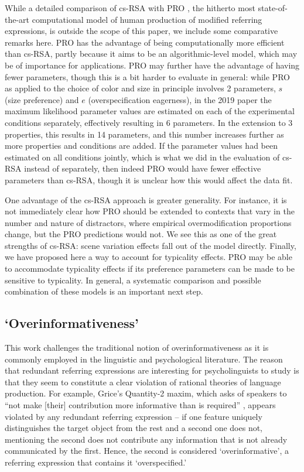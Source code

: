 \documentclass[11pt]{article}
\begin{document}
While a detailed comparison of cs-RSA with PRO \cite{VanGompel2019}, the hitherto most state-of-the-art computational model of human production of modified referring expressions, is outside the scope of this paper, we include some comparative remarks here. PRO has the advantage of being computationally more efficient than cs-RSA, partly because it aims to be an algorithmic-level model, which may be of importance for applications. PRO may further have the advantage of having fewer parameters, though this is a bit harder to evaluate in general: while PRO as applied to the choice of color and size in principle involves 2 parameters, $s$ (size preference) and $e$ (overspecification eagerness), in the 2019 paper the maximum likelihood parameter values are estimated on each of the experimental conditions separately, effectively resulting in 6 parameters. In the extension to 3 properties, this results in 14 parameters, and this number increases further as more properties and conditions are added. If the parameter values had been estimated on all conditions jointly, which is what we did in the evaluation of cs-RSA instead of separately, then indeed PRO would have fewer effective parameters than cs-RSA, though it is unclear how this would affect the data fit. 

One advantage of the cs-RSA approach is greater generality. For instance, it is not immediately clear how PRO should be extended to contexts that vary in the number and nature of distractors, where empirical overmodification proportions  change, but the PRO predictions would not. We see this as one of the great strengths of cs-RSA: scene variation effects fall out of the model directly. Finally, we have proposed here a way to account for typicality effects. PRO may be able to accommodate typicality effects if its preference parameters can be made to be sensitive to typicality. In general, a systematic comparison and possible combination of these models is an important next step.

\subsection{`Overinformativeness'}

This work challenges the traditional notion of overinformativeness as it is commonly employed in the linguistic and psychological literature. The reason that redundant referring expressions are interesting for psycholinguists to study is that they seem to constitute a clear violation of rational theories of language production. For example, Grice's Quantity-2 maxim, which asks of speakers to ``not make [their] contribution more informative than is required'' \cite{grice1975}, appears violated by any redundant referring expression -- if one feature uniquely distinguishes the target object from the rest and a second one does not, mentioning the second does not contribute any information that is not already communicated by the first. Hence, the second is considered `overinformative', a referring expression that contains it  `overspecified.'
\end{document}
